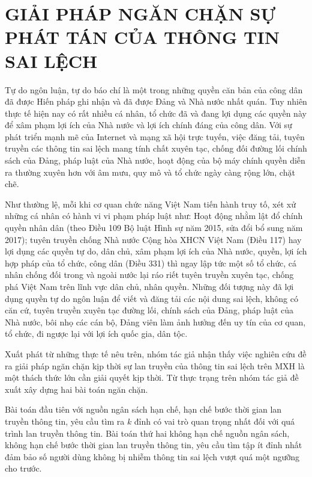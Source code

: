 \chapter{GIẢI PHÁP NGĂN CHẶN SỰ PHÁT TÁN CỦA THÔNG TIN SAI LỆCH}
\thispagestyle{fancy}

Tự do ngôn luận, tự do báo chí là một trong những quyền căn bản của công dân đã được Hiến pháp ghi nhận và đã được Đảng và Nhà nước nhất quán. Tuy nhiên thực tế hiện nay có rất nhiều cá nhân, tổ chức đã và đang lợi dụng các quyền này để xâm phạm lợi ích của Nhà nước và lợi ích chính đáng của công dân. Với sự phát triển mạnh mẽ của Internet và mạng xã hội trực tuyến, việc đăng tải, tuyên truyền các thông tin sai lệch mang tính chất xuyên tạc, chống đối đường lối chính sách của Đảng, pháp luật của Nhà nước, hoạt động của bộ máy chính quyền diễn ra thường xuyên hơn với âm mưu, quy mô và tổ chức ngày càng rộng lớn, chặt chẽ.

Như thường lệ, mỗi khi cơ quan chức năng Việt Nam tiến hành truy tố, xét xử những cá nhân có hành vi vi phạm pháp luật như: Hoạt động nhằm lật đổ chính quyền nhân dân (theo Điều 109 Bộ luật Hình sự năm 2015, sửa đổi bổ sung năm 2017); tuyên truyền chống Nhà nước Cộng hòa XHCN Việt Nam (Điều 117) hay lợi dụng các quyền tự do, dân chủ, xâm phạm lợi ích của Nhà nước, quyền, lợi ích hợp pháp của tổ chức, công dân (Điều 331) thì ngay lập tức một số tổ chức, cá nhân chống đối trong và ngoài nước lại ráo riết tuyên truyền xuyên tạc, chống phá Việt Nam trên lĩnh vực dân chủ, nhân quyền. Những đối tượng này đã lợi dụng quyền tự do ngôn luận để viết và đăng tải các nội dung sai lệch, không có căn cứ, tuyên truyền xuyên tạc đường lối, chính sách của Đảng, pháp luật của Nhà nước, bôi nhọ các cán bộ, Đảng viên làm ảnh hưởng đến uy tín của cơ quan, tổ chức, đi ngược lại với lợi ích quốc gia, dân tộc.

Xuất phát từ những thực tế nêu trên, nhóm tác giả nhận thấy việc nghiên cứu đề ra giải pháp ngăn chặn kịp thời sự lan truyền của thông tin sai lệch trên MXH là một thách thức lớn cần giải quyết kịp thời. Từ thực trạng trên nhóm tác giả đề xuất xây dựng hai bài toán ngăn chặn.

Bài toán đầu tiên với nguồn ngân sách hạn chế, hạn chế bước thời gian lan truyền thông tin, yêu cầu tìm ra $k$ đỉnh có vai trò quan trọng nhất đối với quá trình lan truyền thông tin. Bài toán thứ hai không hạn chế nguồn ngân sách, không hạn chế bước thời gian lan truyền thông tin, yêu cầu tìm tập ít đỉnh nhất đảm bảo số người dùng không bị nhiễm thông tin sai lệch vượt quá một ngưỡng cho trước.

